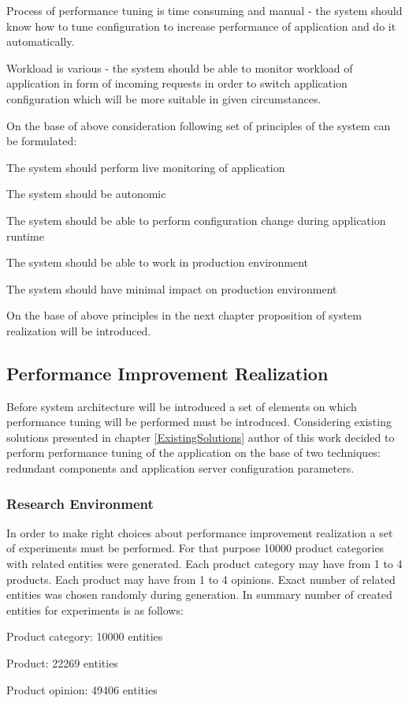 \documentclass[12pt,a4paper]{article}
\let\tempone\itemize
\let\temptwo\enditemize
\renewenvironment{itemize}{\tempone\addtolength{\itemsep}{-0.4\baselineskip}}{\temptwo}
\begin{document}
Process of performance tuning is time consuming and manual - the system should know how to tune configuration to increase performance of application and do it automatically. 

Workload is various - the system should be able to monitor workload of application in form of incoming requests in order to switch application configuration which will be more suitable in given circumstances. 

On the base of above consideration following set of principles of the system can be formulated:

\begin{itemize}
\item The system should perform live monitoring of application
\item The system should be autonomic
\item The system should be able to perform configuration change during application runtime
\item The system should be able to work in production environment
\item The system should have minimal impact on production environment
\end{itemize}

On the base of above principles in the next chapter proposition of system realization will be introduced.  

\subsection{Performance Improvement Realization} \label{realization}

Before system architecture will be introduced a set of elements on which performance tuning will be performed must be introduced.  
Considering existing solutions presented in chapter \ref{ExistingSolutions} author of this work decided to perform performance tuning of the application on the base of two techniques: redundant components and application server configuration parameters. 

\subsubsection{Research Environment}

In order to make right choices about performance improvement realization a set of experiments must be performed. 
For that purpose 10000 product categories with related entities were generated. Each product category may have from 1 to 4 products. Each product may have from 1 to 4 opinions. Exact number of related entities was chosen randomly during generation. In summary number of created entities for experiments is as follows:
\begin{itemize}
\item Product category: 10000 entities
\item Product: 22269 entities
\item Product opinion: 49406 entities
\end{itemize}  
\end{document}
